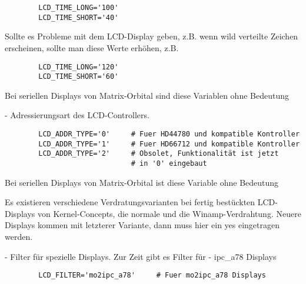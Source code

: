 \begin{description}
\begin{example}
\begin{verbatim}
        LCD_TIME_LONG='100'
        LCD_TIME_SHORT='40'
\end{verbatim}
\end{example}

      Sollte es Probleme mit dem LCD-Display geben, z.B. wenn wild verteilte
      Zeichen erscheinen, sollte man diese Werte erhöhen, z.B.

\begin{example}
\begin{verbatim}
        LCD_TIME_LONG='120'
        LCD_TIME_SHORT='60'
\end{verbatim}
\end{example}

      Bei seriellen Displays von Matrix-Orbital sind diese Variablen
      ohne Bedeutung

 - Adressierungsart des LCD-Controllers.

\begin{example}
\begin{verbatim}
        LCD_ADDR_TYPE='0'     # Fuer HD44780 und kompatible Kontroller
        LCD_ADDR_TYPE='1'     # Fuer HD66712 und kompatible Kontroller
        LCD_ADDR_TYPE='2'     # Obsolet, Funktionalität ist jetzt
                              # in '0' eingebaut

\end{verbatim}
\end{example}
    
    Bei seriellen Displays von Matrix-Orbital ist diese Variable ohne Bedeutung


Es existieren verschiedene Verdratungsvarianten bei fertig bestückten
LCD-Displays von Kernel-Concepts, die normale und die
Winamp-Verdrahtung. Neuere Displays kommen mit letzterer Variante, dann
muss hier ein yes eingetragen werden.


 - Filter für spezielle Displays.
Zur Zeit gibt es Filter für
- ipc\_a78 Displays

\begin{example}
\begin{verbatim}
        LCD_FILTER='mo2ipc_a78'     # Fuer mo2ipc_a78 Displays
\end{verbatim}
\end{example}


\end{description}
